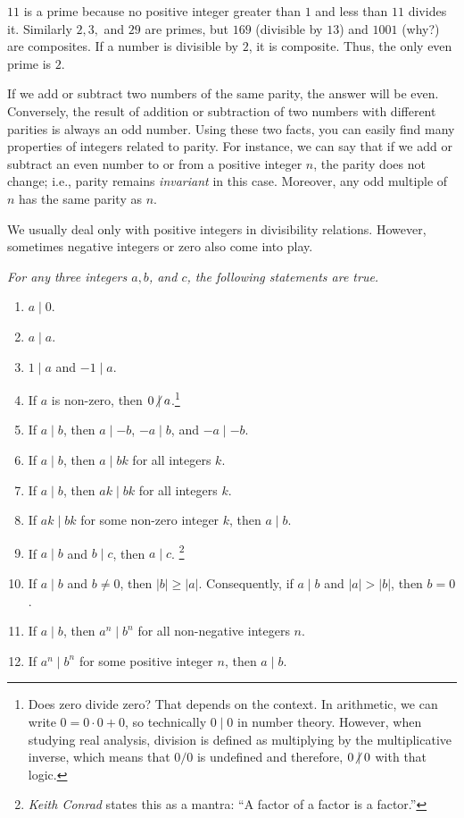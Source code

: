 \documentclass{subfile}
\begin{document}
	\begin{example}
		$11$ is a prime because no positive integer greater than $1$ and less than $11$ divides it. Similarly $2,3,$ and $29$ are primes, but $169$ (divisible by $13$) and $1001$ (why?) are composites. If a number is divisible by $2$, it is composite. Thus, the only even prime is $2$.
	\end{example}

	If we add or subtract two numbers of the same parity, the answer will be even. Conversely, the result of addition or subtraction of two numbers with different parities is always an odd number. Using these two facts, you can easily find many properties of integers related to parity. For instance, we can say that if we add or subtract an even number to or from a positive integer $n$, the parity does not change; i.e., parity remains {\it invariant} in this case. Moreover, any odd multiple of $n$ has the same parity as $n$.

	We usually deal only with positive integers in divisibility relations. However, sometimes negative integers or zero also come into play.

	\begin{proposition}\slshape\label{prop:basicdiv}
		For any three integers $a,b$, and $c$, the following statements are true.
		\begin{enumerate}
			\item $a\mid 0$.
			\item $a\mid a$.
			\item $1\mid a$ and $-1\mid a$.
			\item If $a$ is non-zero, then $0 \centernot\mid a$.\footnote{Does zero divide zero? That depends on the context. In arithmetic, we can write $0 = 0\cdot 0 + 0$, so technically $0 \mid 0$ in number theory. However, when studying real analysis, division is defined as multiplying by the multiplicative inverse, which means that $0/0$ is undefined and therefore, $0 \centernot \mid 0$ with that logic.}
			\item If $a \mid b$, then $a\mid -b$, $-a\mid b$, and $-a\mid -b$.
			\item If $a\mid b$, then $a\mid bk$ for all integers $k$.
			\item If $a\mid b$, then $ak\mid bk$ for all integers $k$.
			\item If $ak\mid bk$ for some non-zero integer $k$, then $a\mid b$.
			\item If $a\mid b$ and $b\mid c$, then $a\mid c$. \footnote{\textit{Keith Conrad} states this as a mantra: ``A factor of a factor is a factor.''}
			\item If $a\mid b$ and $b\neq 0$, then $|b| \geq |a|$. Consequently, if $a\mid b$ and $|a|>|b|$, then $b=0$.
			\item If $a\mid b$, then $a^n\mid b^n$ for all non-negative integers $n$.
			\item If $a^n \mid b^n$ for some positive integer $n$, then $a\mid b$.
		\end{enumerate}

	\end{proposition}
\end{document}
